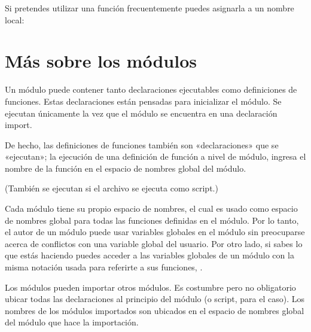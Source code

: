 \documentclass[a4,10pt,spanish]{sphinxmanual}
\begin{document}
\sphinxAtStartPar
Si pretendes utilizar una función frecuentemente puedes asignarla a un nombre local:

\begin{sphinxVerbatim}[commandchars=\\\{\}]
  
\end{sphinxVerbatim}


\section{Más sobre los módulos}
\label{\detokenize{tutorial/modules:more-on-modules}}\label{\detokenize{tutorial/modules:tut-moremodules}}
\sphinxAtStartPar
Un módulo puede contener tanto declaraciones ejecutables como definiciones de funciones. Estas declaraciones están pensadas para inicializar el módulo. Se ejecutan únicamente la  vez que el módulo se encuentra en una declaración import. %
\begin{footnote}[1]\sphinxAtStartFootnote
De hecho, las definiciones de funciones también son «declaraciones» que se «ejecutan»; la ejecución de una definición de función a nivel de módulo, ingresa el nombre de la función en el espacio de nombres global del módulo.
%
\end{footnote} (También se ejecutan si el archivo se ejecuta como script.)

\sphinxAtStartPar
Cada módulo tiene su propio espacio de nombres, el cual es usado como espacio de nombres global para todas las funciones definidas en el módulo. Por lo tanto, el autor de un módulo puede usar variables globales en el módulo sin preocuparse acerca de conflictos con una variable global del usuario. Por otro lado, si sabes lo que estás haciendo puedes acceder a las variables globales de un módulo con la misma notación usada para referirte a sus funciones, .

\sphinxAtStartPar
Los módulos pueden importar otros módulos. Es costumbre pero no obligatorio ubicar todas las declaraciones  al principio del módulo (o script, para el caso). Los nombres de los módulos importados son ubicados en el espacio de nombres global del módulo que hace la importación.
\end{document}
